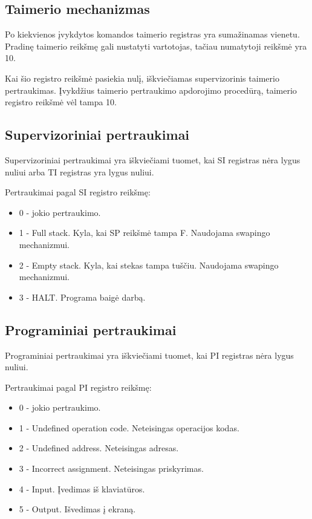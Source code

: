 	\subsection{Taimerio mechanizmas}
	Po kiekvienos įvykdytos komandos taimerio registras yra sumažinamas vienetu. Pradinę taimerio reikšmę gali nustatyti vartotojas, tačiau numatytoji reikšmė yra 10.
	
	Kai šio registro reikšmė pasiekia nulį, iškviečiamas supervizorinis taimerio pertraukimas. Įvykdžius taimerio pertraukimo apdorojimo procedūrą, taimerio registro reikšmė vėl tampa 10.
	
	\subsection{Supervizoriniai pertraukimai}
	Supervizoriniai pertraukimai yra iškviečiami tuomet, kai SI registras nėra lygus nuliui arba TI registras yra lygus nuliui.
	
	Pertraukimai pagal SI registro reikšmę:
	\begin{itemize}
	\item 0 - jokio pertraukimo.
	\item 1 - Full stack. Kyla, kai SP reikšmė tampa F. Naudojama swapingo mechanizmui.
	\item 2 - Empty stack. Kyla, kai stekas tampa tuščiu. Naudojama swapingo mechanizmui.
	\item 3 - HALT. Programa baigė darbą. 
	\end{itemize}
	
	\subsection{Programiniai pertraukimai}
	Programiniai pertraukimai yra iškviečiami tuomet, kai PI registras nėra lygus nuliui.
	
	Pertraukimai pagal PI registro reikšmę:
	\begin{itemize}
	\item 0 - jokio pertraukimo.
	\item 1 - Undefined operation code. Neteisingas operacijos kodas.
	\item 2 - Undefined address. Neteisingas adresas.
	\item 3 - Incorrect assignment. Neteisingas priskyrimas.
	\item 4 - Input. Įvedimas iš klaviatūros.
	\item 5 - Output. Išvedimas į ekraną.
	\end{itemize}
	
